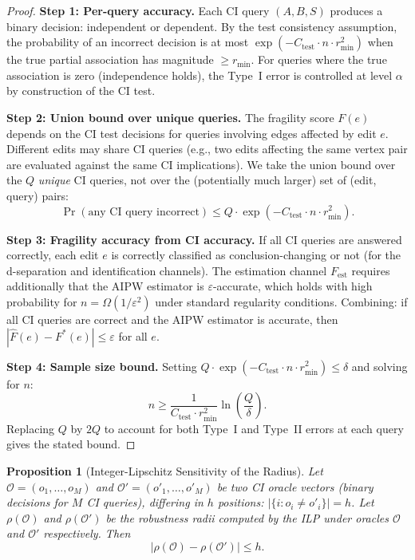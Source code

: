 \documentclass[11pt,a4paper]{article}
\newtheorem{proposition}[theorem]{Proposition}
\theoremstyle{definition}
\theoremstyle{remark}
\newcommand{\fragility}{F}
\newcommand{\radius}{\rho}
\begin{document}
\begin{proof}
\textbf{Step 1: Per-query accuracy.}
Each CI query $(A, B, S)$ produces a binary decision: independent or dependent.
By the test consistency assumption, the probability of an incorrect decision is
at most $\exp(-C_{\mathrm{test}} \cdot n \cdot r_{\min}^2)$ when the true
partial association has magnitude $\geq r_{\min}$. For queries where the true
association is zero (independence holds), the Type~I error is controlled at
level $\alpha$ by construction of the CI test.

\textbf{Step 2: Union bound over unique queries.}
The fragility score $\fragility(e)$ depends on the CI test decisions for
queries involving edges affected by edit $e$. Different edits may share
CI queries (e.g., two edits affecting the same vertex pair are evaluated
against the same CI implications). We take the union bound over the $Q$
\emph{unique} CI queries, not over the (potentially much larger) set of
(edit, query) pairs:
\[
  \Pr(\text{any CI query incorrect}) \leq Q \cdot
  \exp(-C_{\mathrm{test}} \cdot n \cdot r_{\min}^2).
\]

\textbf{Step 3: Fragility accuracy from CI accuracy.}
If all CI queries are answered correctly, each edit $e$ is correctly
classified as conclusion-changing or not (for the d-separation and
identification channels). The estimation channel $\fragility_{\mathrm{est}}$
requires additionally that the AIPW estimator is $\varepsilon$-accurate,
which holds with high probability for $n = \Omega(1/\varepsilon^2)$ under
standard regularity conditions. Combining: if all CI queries are correct
and the AIPW estimator is accurate, then
$|\hat{\fragility}(e) - \fragility^*(e)| \leq \varepsilon$ for all $e$.

\textbf{Step 4: Sample size bound.}
Setting $Q \cdot \exp(-C_{\mathrm{test}} \cdot n \cdot r_{\min}^2)
\leq \delta$ and solving for $n$:
\[
  n \geq \frac{1}{C_{\mathrm{test}} \cdot r_{\min}^2}
  \ln\!\left(\frac{Q}{\delta}\right).
\]
Replacing $Q$ by $2Q$ to account for both Type~I and Type~II errors
at each query gives the stated bound.
\end{proof}

\begin{proposition}[Integer-Lipschitz Sensitivity of the Radius]\label{prop:int_lipschitz}
Let $\mathcal{O} = (o_1, \ldots, o_M)$ and $\mathcal{O}' = (o'_1, \ldots, o'_M)$
be two CI oracle vectors (binary decisions for $M$ CI queries), differing in
$h$ positions: $|\{i : o_i \neq o'_i\}| = h$. Let $\radius(\mathcal{O})$ and
$\radius(\mathcal{O}')$ be the robustness radii computed by the ILP under
oracles $\mathcal{O}$ and $\mathcal{O}'$ respectively. Then
\[
  |\radius(\mathcal{O}) - \radius(\mathcal{O}')| \leq h.
\]
\end{proposition}
\end{document}
